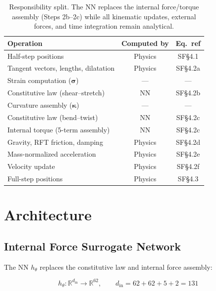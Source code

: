 \documentclass[11pt]{article}
\newcommand{\Real}{\mathbb{R}}
\newcommand{\phys}[1]{{\color{physicsblue}#1}}
\newcommand{\nn}[1]{{\color{nngreen}#1}}
\begin{document}
\begin{table}[H]
  \centering
  \renewcommand{\arraystretch}{1.25}
  \begin{tabular}{p{5.5cm}cc}
    \toprule
    \textbf{Operation} & \textbf{Computed by} & \textbf{Eq.\ ref} \\
    \midrule
    Half-step positions & \phys{Physics} & SF\S4.1 \\
    Tangent vectors, lengths, dilatation & \phys{Physics} & SF\S4.2a \\
    Strain computation ($\bm{\sigma}$) & --- & --- \\
    Constitutive law (shear--stretch) & \nn{NN} & SF\S4.2b \\
    Curvature assembly ($\bm{\kappa}$) & --- & --- \\
    Constitutive law (bend--twist) & \nn{NN} & SF\S4.2c \\
    Internal torque (5-term assembly) & \nn{NN} & SF\S4.2c \\
    Gravity, RFT friction, damping & \phys{Physics} & SF\S4.2d \\
    Mass-normalized acceleration & \phys{Physics} & SF\S4.2e \\
    Velocity update & \phys{Physics} & SF\S4.2f \\
    Full-step positions & \phys{Physics} & SF\S4.3 \\
    \bottomrule
  \end{tabular}
  \caption{Responsibility split.  The NN replaces the internal force/torque assembly (Steps 2b--2c) while all kinematic updates, external forces, and time integration remain analytical.}
  \label{tab:responsibility}
\end{table}


\section{Architecture}
\label{sec:architecture}

\subsection{Internal Force Surrogate Network}

The NN $h_\theta$ replaces the constitutive law and internal force assembly:

\begin{equation}
  h_\theta\colon \Real^{d_{\text{in}}} \to \Real^{62}, \qquad
  d_{\text{in}} = 62 + 62 + 5 + 2 = 131
  \label{eq:nn-dims}
\end{equation}
\end{document}
